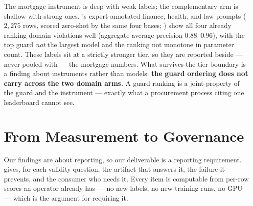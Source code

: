 \documentclass[manuscript,screen,review,anonymous]{acmart}
\begin{document}
The mortgage instrument is deep with weak labels; the complementary arm is shallow with strong ones.
\citet{expguard2026}'s expert-annotated finance, health, and law prompts ($2{,}275$ rows, scored
zero-shot by the same four bases; ) show all four already ranking domain violations
well (aggregate average precision $0.88$--$0.96$), with the top guard \emph{not} the largest model and
the ranking not monotone in parameter count. These labels sit at a strictly stronger tier, so they are
reported beside --- never pooled with --- the mortgage numbers. What survives the tier boundary is a
finding about instruments rather than models: \textbf{the guard ordering does not carry across the two
domain arms.} A guard ranking is a joint property of the guard and the instrument --- exactly what a
procurement process citing one leaderboard cannot see.

\section{From Measurement to Governance}
\label{sec:governance}

Our findings are about reporting, so our deliverable is a reporting requirement.  gives,
for each validity question, the artifact that answers it, the failure it prevents, and the consumer who
needs it. Every item is computable from per-row scores an operator already has --- no new labels, no new
training runs, no GPU --- which is the argument for requiring it.
\end{document}

